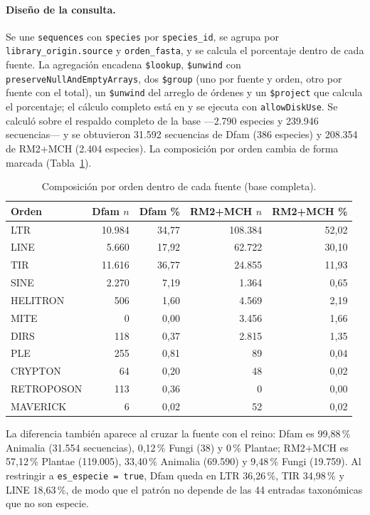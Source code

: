 \documentclass[journal]{IEEEtran}
\begin{document}
\paragraph*{Diseño de la consulta.}
Se une \texttt{sequences} con \texttt{species} por \texttt{species\_id}, se agrupa por
\texttt{library\_origin.source} y \texttt{orden\_fasta}, y se calcula el porcentaje dentro de cada
fuente. La agregación encadena \texttt{\$lookup}, \texttt{\$unwind} con
\texttt{preserveNullAndEmptyArrays}, dos \texttt{\$group} (uno por fuente y orden, otro por
fuente con el total), un \texttt{\$unwind} del arreglo de órdenes y un \texttt{\$project}
que calcula el porcentaje; el cálculo completo está en
 y se ejecuta con \texttt{allowDiskUse}. Se calculó
sobre el respaldo completo de la base ---2.790 especies y 239.946 secuencias--- y se
obtuvieron 31.592 secuencias de Dfam (386 especies) y 208.354 de RM2+MCH (2.404 especies).
La composición por orden cambia de forma marcada (Tabla~\ref{tab:dfam_global}).

\begin{table}[!t]
\caption{Composición por orden dentro de cada fuente (base completa).}
\label{tab:dfam_global}
\centering
\scriptsize
\setlength{\tabcolsep}{3pt}
\begin{tabular}{@{}lrrrr@{}}
\toprule
Orden & Dfam $n$ & Dfam \% & RM2+MCH $n$ & RM2+MCH \% \\
\midrule
LTR & 10.984 & 34,77 & 108.384 & 52,02 \\
LINE & 5.660 & 17,92 & 62.722 & 30,10 \\
TIR & 11.616 & 36,77 & 24.855 & 11,93 \\
SINE & 2.270 & 7,19 & 1.364 & 0,65 \\
HELITRON & 506 & 1,60 & 4.569 & 2,19 \\
MITE & 0 & 0,00 & 3.456 & 1,66 \\
DIRS & 118 & 0,37 & 2.815 & 1,35 \\
PLE & 255 & 0,81 & 89 & 0,04 \\
CRYPTON & 64 & 0,20 & 48 & 0,02 \\
RETROPOSON & 113 & 0,36 & 0 & 0,00 \\
MAVERICK & 6 & 0,02 & 52 & 0,02 \\
\bottomrule
\end{tabular}
\end{table}

La diferencia también aparece al cruzar la fuente con el reino: Dfam es 99,88\,\% Animalia
(31.554 secuencias), 0,12\,\% Fungi (38) y 0\,\% Plantae; RM2+MCH es 57,12\,\% Plantae
(119.005), 33,40\,\% Animalia (69.590) y 9,48\,\% Fungi (19.759). Al restringir a
\texttt{es\_especie = true}, Dfam queda en LTR 36,26\,\%, TIR 34,98\,\% y LINE 18,63\,\%, de
modo que el patrón no depende de las 44 entradas taxonómicas que no son especie.
\end{document}
